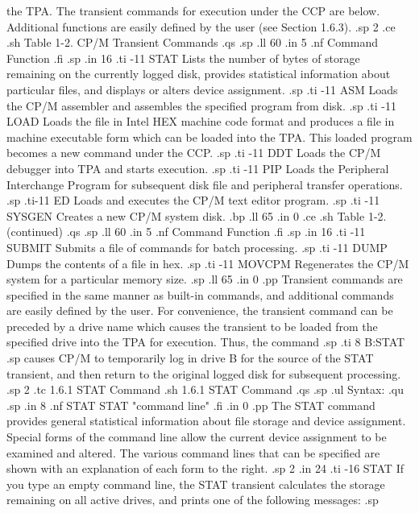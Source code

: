 the TPA.  The transient commands for execution under the CCP are below.  
Additional functions are easily defined by the user (see Section 1.6.3).
.sp 2
.ce
.sh
Table 1-2.  CP/M Transient Commands
.qs
.sp
.ll 60
.in 5
.nf
Command                      Function
.fi
.sp
.in 16
.ti -11
STAT       Lists the number of bytes of storage remaining on the currently 
logged disk, provides statistical information about particular files, and 
displays or alters device assignment.
.sp
.ti -11
ASM        Loads the CP/M assembler and assembles the specified program from 
disk.
.sp
.ti -11
LOAD       Loads the file in Intel HEX machine code format and produces a 
file in machine executable form which can be loaded into the TPA.  This loaded 
program becomes a new command under the CCP.
.sp
.ti -11
DDT        Loads the CP/M debugger into TPA and starts execution.
.sp
.ti -11
PIP        Loads the Peripheral Interchange Program for subsequent disk file 
and peripheral transfer operations.
.sp
.ti-11
ED         Loads and executes the CP/M text editor program.
.sp
.ti -11
SYSGEN     Creates a new CP/M system disk.
.bp
.ll 65
.in 0
.ce
.sh
Table 1-2.  (continued)
.qs
.sp
.ll 60
.in 5
.nf
Command                      Function
.fi
.sp
.in 16
.ti -11
SUBMIT     Submits a file of commands for batch processing.
.sp 
.ti -11
DUMP       Dumps the contents of a file in hex.
.sp
.ti -11
MOVCPM     Regenerates the CP/M system for a particular memory size.
.sp 
.ll 65
.in 0
.pp
Transient commands are specified in the same manner as built-in commands, and 
additional commands are easily defined by the user.  For convenience, the 
transient command can be preceded by a drive name which causes the transient 
to be loaded from the specified drive into the TPA for execution.  Thus, the 
command
.sp
.ti 8
B:STAT
.sp
causes CP/M to temporarily log in drive B for the source of the STAT 
transient, and then return to the original logged disk for subsequent 
processing.
.sp 2
.tc         1.6.1  STAT Command
.sh
1.6.1  STAT Command
.qs
.sp
.ul
Syntax:
.qu
.sp
.in 8
.nf
STAT
STAT "command line"
.fi
.in 0
.pp
The STAT command provides general statistical information about file storage 
and device assignment.  Special forms of the command line allow the current 
device assignment to be 
examined and altered.  The various command lines that can be specified are 
shown with an explanation of each form to the right.
.sp 2
.in 24
.ti -16
STAT            If you type an empty command line, the STAT transient 
calculates the storage remaining on all active drives, and prints 
one of the following messages:
.sp
